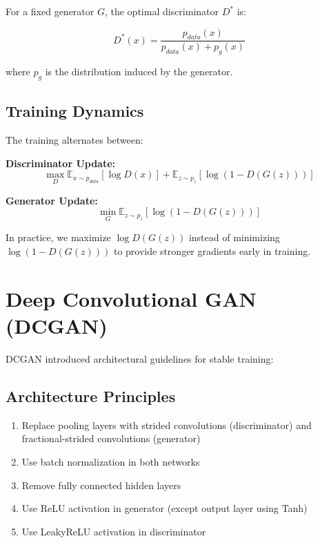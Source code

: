 \documentclass[12pt,a4paper]{article}
\begin{document}
For a fixed generator $G$, the optimal discriminator $D^*$ is:

\begin{equation}
D^*(x) = \frac{p_{data}(x)}{p_{data}(x) + p_g(x)}
\end{equation}

where $p_g$ is the distribution induced by the generator.

\subsection{Training Dynamics}

The training alternates between:

\textbf{Discriminator Update:}
\begin{equation}
\max_D \mathbb{E}_{x \sim p_{data}}[\log D(x)] + \mathbb{E}_{z \sim p_z}[\log(1 - D(G(z)))]
\end{equation}

\textbf{Generator Update:}
\begin{equation}
\min_G \mathbb{E}_{z \sim p_z}[\log(1 - D(G(z)))]
\end{equation}

In practice, we maximize $\log D(G(z))$ instead of minimizing $\log(1 - D(G(z)))$ to provide stronger gradients early in training.

\section{Deep Convolutional GAN (DCGAN)}

DCGAN introduced architectural guidelines for stable training:

\subsection{Architecture Principles}

\begin{enumerate}
    \item Replace pooling layers with strided convolutions (discriminator) and fractional-strided convolutions (generator)
    \item Use batch normalization in both networks
    \item Remove fully connected hidden layers
    \item Use ReLU activation in generator (except output layer using Tanh)
    \item Use LeakyReLU activation in discriminator
\end{enumerate}
\end{document}
